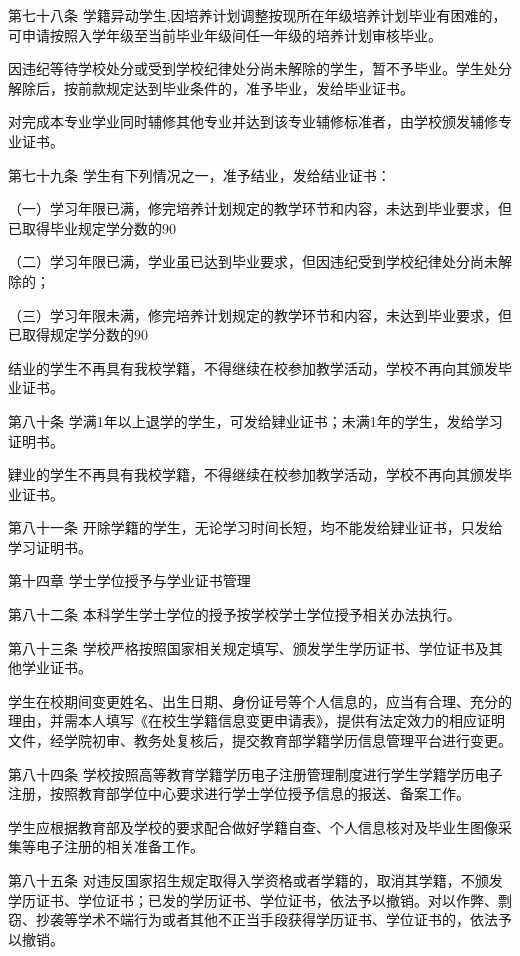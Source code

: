 \documentclass[UTF8,12pt,a4paper]{report}
\begin{document}
第七十八条  学籍异动学生,因培养计划调整按现所在年级培养计划毕业有困难的，可申请按照入学年级至当前毕业年级间任一年级的培养计划审核毕业。

因违纪等待学校处分或受到学校纪律处分尚未解除的学生，暂不予毕业。学生处分解除后，按前款规定达到毕业条件的，准予毕业，发给毕业证书。

对完成本专业学业同时辅修其他专业并达到该专业辅修标准者，由学校颁发辅修专业证书。

第七十九条  学生有下列情况之一，准予结业，发给结业证书：

（一）学习年限已满，修完培养计划规定的教学环节和内容，未达到毕业要求，但已取得毕业规定学分数的90%

（二）学习年限已满，学业虽已达到毕业要求，但因违纪受到学校纪律处分尚未解除的；

（三）学习年限未满，修完培养计划规定的教学环节和内容，未达到毕业要求，但已取得规定学分数的90%

结业的学生不再具有我校学籍，不得继续在校参加教学活动，学校不再向其颁发毕业证书。

第八十条  学满1年以上退学的学生，可发给肄业证书；未满1年的学生，发给学习证明书。

肄业的学生不再具有我校学籍，不得继续在校参加教学活动，学校不再向其颁发毕业证书。

第八十一条  开除学籍的学生，无论学习时间长短，均不能发给肄业证书，只发给学习证明书。



第十四章  学士学位授予与学业证书管理

第八十二条  本科学生学士学位的授予按学校学士学位授予相关办法执行。

第八十三条  学校严格按照国家相关规定填写、颁发学生学历证书、学位证书及其他学业证书。

学生在校期间变更姓名、出生日期、身份证号等个人信息的，应当有合理、充分的理由，并需本人填写《在校生学籍信息变更申请表》，提供有法定效力的相应证明文件，经学院初审、教务处复核后，提交教育部学籍学历信息管理平台进行变更。

第八十四条  学校按照高等教育学籍学历电子注册管理制度进行学生学籍学历电子注册，按照教育部学位中心要求进行学士学位授予信息的报送、备案工作。

学生应根据教育部及学校的要求配合做好学籍自查、个人信息核对及毕业生图像采集等电子注册的相关准备工作。

第八十五条  对违反国家招生规定取得入学资格或者学籍的，取消其学籍，不颁发学历证书、学位证书；已发的学历证书、学位证书，依法予以撤销。对以作弊、剽窃、抄袭等学术不端行为或者其他不正当手段获得学历证书、学位证书的，依法予以撤销。
\end{document}
